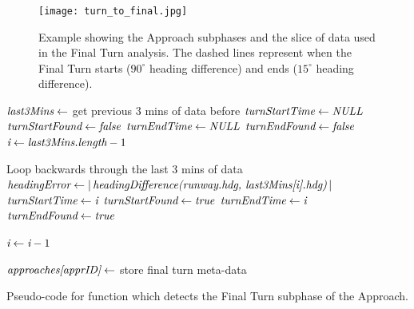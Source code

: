             \begin{figure}
            	\centering
                \texttt{[image: turn\_to\_final.jpg]}
                \caption{Example showing the Approach subphases and the slice of data used in the Final Turn analysis.  The dashed lines represent when the Final Turn starts ($90^\circ$ heading difference) and ends ($15^\circ$ heading difference).}
                \label{fig:final_turn_example}
            \end{figure}
        
            \begin{algorithm}
                \begin{algorithmic}[1]\raggedright
                        \State $ \textit{last3Mins} \gets $ get previous 3 mins of data before 
                        \State $ \textit{turnStartTime} \gets \textit{NULL} $
                        \State $ \textit{turnStartFound} \gets \textit{false} $
                        \State $ \textit{turnEndTime} \gets \textit{NULL} $
                        \State $ \textit{turnEndFound} \gets \textit{false} $
                        \State $ \textit{i} \gets \textit{last3Mins.length} - 1 $
                        
                        \Comment Loop backwards through the last 3 mins of data
                        	\State $ \textit{headingError} \gets \left|\,\textit{headingDifference(runway.hdg, last3Mins[i].hdg)}\,\right| $
                            	\State $ \textit{turnStartTime} \gets \textit{i} $
                                \State $ \textit{turnStartFound} \gets \textit{true} $
                            \EndIf
                            	\State $ \textit{turnEndTime} \gets \textit{i} $
                                \State $ \textit{turnEndFound} \gets \textit{true} $
                            \EndIf
                            
                            \State $ \textit{i} \gets \textit{i} - 1 $
                        \EndWhile
                        
                        \State $ \textit{approaches[apprID]} \gets $ store final turn meta-data
                        \State \Return {}
                    \EndFunction
                \end{algorithmic}
                \caption{Pseudo-code for function which detects the Final Turn subphase of the Approach.}
                \label{fig:detect_final_turn}
            \end{algorithm}
        
